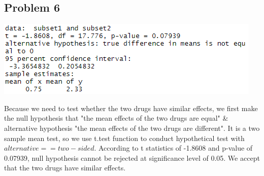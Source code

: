\documentclass[12pt]{article}
\begin{document}
\subsection*{Problem 6}

\begin{center}
	\includegraphics[]{p6.png}
\end{center}
Because we need to test whether the two drugs have similar effects, we first make the null hypothesis that "the mean effects of the two drugs are equal" \& alternative hypothesis "the mean effects of the two drugs are different". It is a two sample mean test, so we use t.test function to conduct hypothetical test with $alternative == two-sided$. According to t statistics of -1.8608 and p-value of 0.07939, null hypothesis cannot be rejected at significance level of 0.05. We accept that the two drugs have similar effects.
\end{document}
